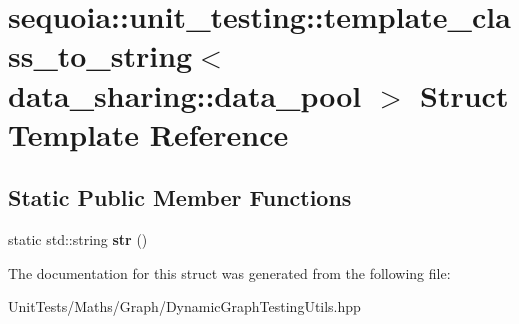 \hypertarget{structsequoia_1_1unit__testing_1_1template__class__to__string_3_01data__sharing_1_1data__pool_01_4}{}\section{sequoia\+::unit\+\_\+testing\+::template\+\_\+class\+\_\+to\+\_\+string$<$ data\+\_\+sharing\+::data\+\_\+pool $>$ Struct Template Reference}
\label{structsequoia_1_1unit__testing_1_1template__class__to__string_3_01data__sharing_1_1data__pool_01_4}
\subsection*{Static Public Member Functions}
\begin{DoxyCompactItemize}
\item 
\mbox{\label{structsequoia_1_1unit__testing_1_1template__class__to__string_3_01data__sharing_1_1data__pool_01_4_ac917e812177c0e02f68c4be47781a85a}} 
static std\+::string {\bfseries str} ()
\end{DoxyCompactItemize}


The documentation for this struct was generated from the following file\+:\begin{DoxyCompactItemize}
\item 
Unit\+Tests/\+Maths/\+Graph/Dynamic\+Graph\+Testing\+Utils.\+hpp\end{DoxyCompactItemize}
